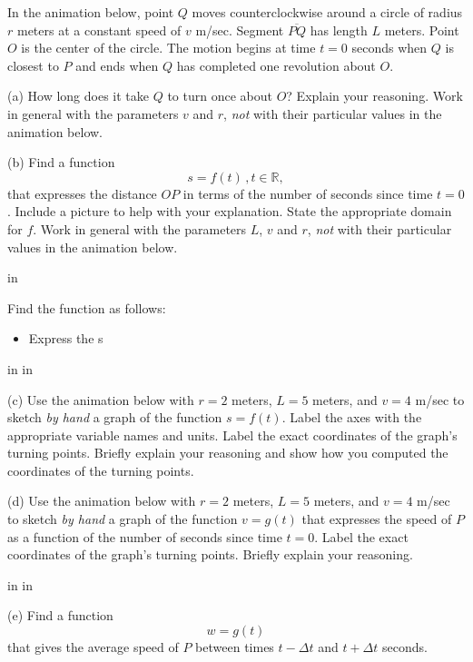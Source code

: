 \documentclass{ximera}
\newcommand{\pskip}{\vskip 0.1 in}
\begin{document}
\begin{question} \label{Q7:RightTriangle}
In the animation below, point $Q$ moves counterclockwise around a circle of radius $r$ meters at a constant speed of $v$ m/sec. Segment $\overline{PQ}$ has length $L$ meters. Point $O$ is the center of the circle. The motion begins at time $t=0$ seconds when $Q$ is closest to $P$ and ends when $Q$ has completed one revolution about $O$.

(a) How long does it take $Q$ to turn once about $O$? Explain your reasoning. Work in general with the parameters $v$ and $r$, \emph{not} with their particular values in the animation below.

(b) Find a function 
\[
    s = f(t) \, , t \in \mathbb{R} ,
\] 
that expresses the distance $OP$ in terms of the number of seconds since time $t=0$. Include a picture to help with your explanation. State the appropriate domain for $f$. Work in general with the parameters $L$, $v$ and $r$, \emph{not} with their particular values in the animation below.

\pskip

Find the function as follows:

\begin{itemize}

\item{Express the s}

\end{itemize}



\pskip \pskip

(c) Use the animation below with $r=2$ meters, $L=5$ meters, and $v=4$ m/sec to sketch \emph{by hand} a graph of the function $s=f(t)$. Label the axes with the appropriate variable names and units. Label the exact coordinates of the graph's turning points. Briefly explain your reasoning and show how you computed the coordinates of the turning points. 

(d) Use the animation below with $r=2$ meters, $L=5$ meters, and $v=4$ m/sec to sketch \emph{by hand} a graph of the function $v=g(t)$ that expresses the speed of $P$ as a function of the number of seconds since time $t=0$. Label the exact coordinates of the graph's turning points. Briefly explain your reasoning. 

\pskip \pskip

(e) Find a function
\[
    w = g(t)
\]
that gives the average speed of $P$ between times $t-\Delta t$ and $t+\Delta t$ seconds.

 
\begin{exploration}

 
\begin{onlineOnly}
    \begin{center}
\end{center}
\end{onlineOnly}
\end{exploration}

\end{question}
\end{document}
